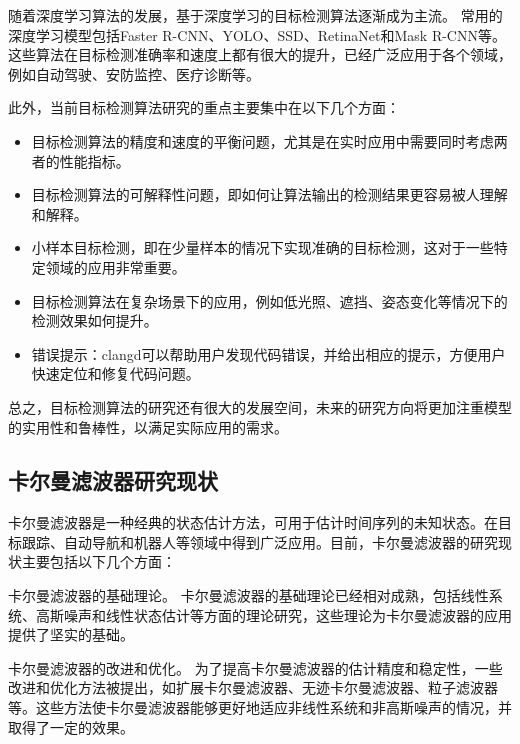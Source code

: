 随着深度学习算法的发展，基于深度学习的目标检测算法逐渐成为主流。
常用的深度学习模型包括Faster R-CNN、YOLO、SSD、RetinaNet和Mask R-CNN等。
这些算法在目标检测准确率和速度上都有很大的提升，已经广泛应用于各个领域，例如自动驾驶、安防监控、医疗诊断等。
\par
此外，当前目标检测算法研究的重点主要集中在以下几个方面：
\begin{itemize}[itemindent=2em]
    \item 目标检测算法的精度和速度的平衡问题，尤其是在实时应用中需要同时考虑两者的性能指标。
    
    \item 目标检测算法的可解释性问题，即如何让算法输出的检测结果更容易被人理解和解释。
    
    \item 小样本目标检测，即在少量样本的情况下实现准确的目标检测，这对于一些特定领域的应用非常重要。
    
    \item 目标检测算法在复杂场景下的应用，例如低光照、遮挡、姿态变化等情况下的检测效果如何提升。
    
    \item 错误提示：clangd可以帮助用户发现代码错误，并给出相应的提示，方便用户快速定位和修复代码问题。
\end{itemize}


总之，目标检测算法的研究还有很大的发展空间，未来的研究方向将更加注重模型的实用性和鲁棒性，以满足实际应用的需求。

\subsection{卡尔曼滤波器研究现状}
卡尔曼滤波器是一种经典的状态估计方法，可用于估计时间序列的未知状态。在目标跟踪、自动导航和机器人等领域中得到广泛应用。目前，卡尔曼滤波器的研究现状主要包括以下几个方面：
\par
卡尔曼滤波器的基础理论。
卡尔曼滤波器的基础理论已经相对成熟，包括线性系统、高斯噪声和线性状态估计等方面的理论研究，这些理论为卡尔曼滤波器的应用提供了坚实的基础。
\par
卡尔曼滤波器的改进和优化。
为了提高卡尔曼滤波器的估计精度和稳定性，一些改进和优化方法被提出，如扩展卡尔曼滤波器、无迹卡尔曼滤波器、粒子滤波器等。这些方法使卡尔曼滤波器能够更好地适应非线性系统和非高斯噪声的情况，并取得了一定的效果。


